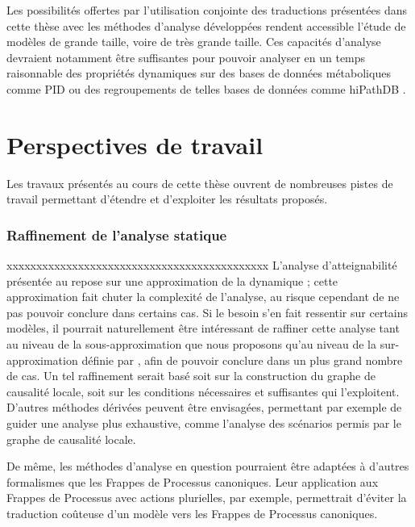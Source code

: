 \myskip

Les possibilités offertes par l'utilisation conjointe des traductions présentées
dans cette thèse avec les méthodes d'analyse développées
rendent accessible l'étude de modèles de grande taille, voire de très grande taille.
Ces capacités d'analyse devraient notamment être suffisantes pour pouvoir analyser
en un temps raisonnable des propriétés dynamiques sur des bases de données métaboliques
comme PID \cite{schaefer09pid}
ou des regroupements de telles bases de données comme hiPathDB \cite{yu12hipathdb}.



\section{Perspectives de travail}

Les travaux présentés au cours de cette thèse ouvrent de nombreuses pistes de travail
permettant d'étendre et d'exploiter les résultats proposés.

% 



\subsubsection*{Raffinement de l'analyse statique}

xxxxxxxxxxxxxxxxxxxxxxxxxxxxxxxxxxxxxxxxxxxx
L'analyse d'atteignabilité présentée au 
repose sur une approximation de la dynamique ;
cette approximation fait chuter la complexité de l'analyse,
au risque cependant de ne pas pouvoir conclure dans certains cas.
Si le besoin s'en fait ressentir sur certains modèles,
il pourrait naturellement être intéressant de raffiner cette analyse tant au niveau
de la sous-approximation que nous proposons qu'au niveau
de la sur-approximation définie par ,
afin de pouvoir conclure dans un plus grand nombre de cas.
Un tel raffinement serait basé soit sur la construction du graphe de causalité locale,
soit sur les conditions nécessaires et suffisantes qui l'exploitent.
D'autres méthodes dérivées peuvent être envisagées,
permettant par exemple de guider une analyse plus exhaustive,
comme l'analyse des scénarios permis par le graphe de causalité locale.

De même, les méthodes d'analyse en question pourraient être adaptées à d'autres formalismes
que les Frappes de Processus canoniques.
Leur application aux Frappes de Processus avec actions plurielles, par exemple,
permettrait d'éviter la traduction coûteuse d'un modèle vers les Frappes de Processus canoniques.

